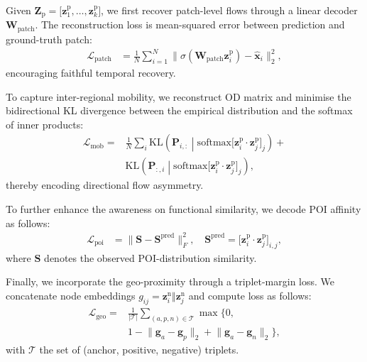 Given $\mathbf Z_{\mathrm p}=\bigl[\mathbf z^{\mathrm p}_1,\ldots,\mathbf z^{\mathrm p}_k\bigr]$, we first recover patch-level flows through a linear decoder $\mathbf W_{\text{patch}}$. The reconstruction loss is mean-squared error between prediction and ground-truth patch:
\begin{equation}
    \begin{aligned}
        \mathcal L_{\text{patch}} &=\frac1N\sum_{i=1}^{N}\bigl\lVert\sigma(\mathbf W_{\text{patch}}\mathbf z^{\mathrm p}_i)-\hat{\mathbf x}_i\bigr\rVert_2^2,
    \end{aligned}
\end{equation}
encouraging faithful temporal recovery. 

To capture inter-regional mobility, we reconstruct OD matrix and minimise the bidirectional KL divergence between the empirical distribution and the softmax of inner products:
\begin{equation}
    \begin{aligned}
        \mathcal L_{\text{mob}}=&\frac1N\sum_{i} \mathrm{KL}\left(\mathbf P_{i,:}\middle| \mathrm{softmax}\bigl[\mathbf z_i^{\mathrm p}\cdot\mathbf z_j^{\mathrm p}\bigr]_{j}\right)+\\
        &\mathrm{KL}\left(\mathbf P_{:,i}\middle| \mathrm{softmax}\bigl[\mathbf z_i^{\mathrm p}\cdot\mathbf z_j^{\mathrm p}\bigr]_{j}\right),
    \end{aligned}
\end{equation}
thereby encoding directional flow asymmetry.

To further enhance the awareness on functional similarity, we decode POI affinity as follows:
\begin{equation}
    \begin{aligned}
        \mathcal L_{\text{poi}}   &=\bigl\lVert \mathbf S- \mathbf S^{\mathrm{pred}}\bigr\rVert_F^2,
        \quad \mathbf S^{\mathrm{pred}}=\bigl[\mathbf z_i^{\mathrm {p}}\cdot\mathbf z_j^{\mathrm {p}}\bigr]_{i,j},
    \end{aligned}
\end{equation}
where $\mathbf S$ denotes the observed POI-distribution similarity.

Finally, we incorporate the geo-proximity through a triplet-margin loss. We concatenate node embeddings $g_{ij}= \mathbf z^{\mathrm n}_i\Vert\mathbf z^{\mathrm n}_j$ and compute loss as follows:
\begin{equation}
    \begin{aligned}
        \mathcal L_{\text{geo}}   =&\frac{1}{|\mathcal T|}\sum_{(a,p,n)\in\mathcal T}
        \max \{0,\\
        &1-\lVert\mathbf g_a-\mathbf g_p\rVert_2+\lVert\mathbf g_a-\mathbf g_n\rVert_2\},
    \end{aligned}
\end{equation}
with $\mathcal T$ the set of (anchor, positive, negative) triplets.

